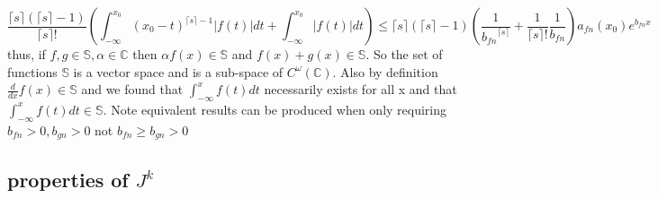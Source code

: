 \documentclass[%
 onecolumn,
 amsmath, amssymb, aps, pra, 10pt
]{revtex4-2}
\begin{document}
\[ \frac{\lceil s \rceil(\lceil s \rceil - 1)}{\lceil s \rceil!} \left(\int_{-\infty}^{x_0} (x_0 - t)^{\lceil s \rceil -1} \left|f(t)\right|dt + \int_{-\infty}^{x_0} \left|f(t)\right|dt\right) \leq \lceil s \rceil(\lceil s \rceil - 1)\left(\frac{1}{{b_{fn}}^{\lceil s \rceil}} + \frac{1}{\lceil s \rceil!}\frac{1}{b_{fn}}\right)a_{fn}(x_0)e^{b_{fn}x}\]
thus, if $f, g \in \mathbb{S}, \alpha \in \mathbb{C}$ then $\alpha f(x) \in \mathbb{S}$ and $f(x) + g(x) \in \mathbb{S}$. So the set of functions $\mathbb{S}$ is a vector space and is a sub-space of $C^\omega(\mathbb{C})$. Also by definition $\frac{d}{dx}f(x) \in \mathbb{S}$ and we found that $\int_{-\infty}^x f(t)dt$ necessarily exists for all x and that $\int_{-\infty}^x f(t)dt \in \mathbb{S}$. Note equivalent results can be produced when only requiring $b_{fn}>0, b_{gn}>0$ not $b_{fn}\geq b_{gn} > 0$

\subsection{properties of $J^k$}



\end{document}
